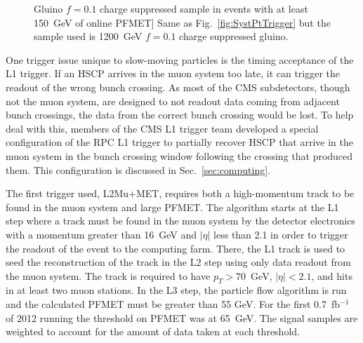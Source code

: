 \begin{figure}
\begin{center}
Gluino $f=0.1$ charge suppressed sample in events with at least 150~GeV of online PFMET]
      {Same as Fig.~\ref{fig:SystPtTrigger} but the sample used is 1200~GeV $f=0.1$ charge suppressed gluino.
        }
      \label{fig:SystPtTriggerN}
  \end{center}
\end{figure}

One trigger issue unique to slow-moving particles is the timing acceptance of the L1 trigger. If an HSCP arrives in the muon system too late, it can trigger the
readout of the wrong bunch crossing. As most of the CMS subdetectors, though not the muon system, are designed to not readout data coming from adjacent bunch crossings,
the data from the correct bunch crossing would be lost. To help deal with this, members of the CMS L1 trigger team developed a special configuration of the
RPC L1 trigger to partially recover HSCP that arrive in the muon system in the bunch crossing window following the crossing that produced them.
This configuration is discussed in Sec.~\ref{sec:computing}.


The first trigger used, L2Mu+MET, requires both a high-momentum track to be found in the muon system and large PFMET.
The algorithm starts at the L1 step where a track must be found in the muon system by the detector electronics with a momentum greater than 16~GeV and $|\eta|$ less than 2.1 
in order to trigger the readout of the event to the computing farm.
There, the L1 track is used to seed the reconstruction of the track in the L2 step using only data readout from the muon system.
The track is required to have $p_T > 70$~GeV, $|\eta| < 2.1$, and hits in at least two muon stations.
In the L3 step, the particle flow algorithm is run and the calculated PFMET must be greater than 55 GeV.
For the first 0.7~fb$^{-1}$ of 2012 running the threshold on PFMET was at 65~GeV. The signal samples are weighted
to account for the amount of data taken at each threshold.

